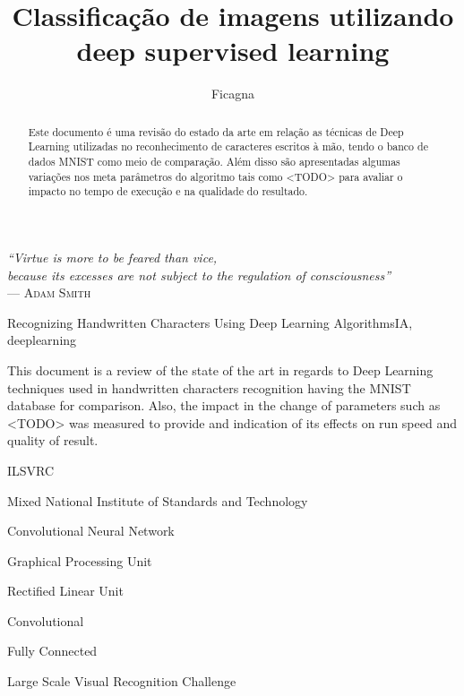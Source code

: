 \documentclass[cic,tc]{iiufrgs}
\title{Classificação de imagens utilizando deep supervised learning}
\author{Ficagna}{Alan}
\date{}{2015}
\begin{document}
\maketitle

\clearpage
\begin{flushright}
  \mbox{}\vfill
  {\sffamily\itshape{}
    ``Virtue is more to be feared than vice,\\
    because its excesses are not subject to the regulation of consciousness''\\}
  --- \textsc{Adam Smith}
\end{flushright}

\begin{abstract}

Este documento é uma revisão do estado da arte em relação as técnicas de
Deep Learning utilizadas no reconhecimento de caracteres escritos à mão, tendo o
banco de dados MNIST como meio de comparação. Além disso são apresentadas
algumas variações nos meta parâmetros do algoritmo tais como <TODO> para
avaliar o impacto no tempo de execução e na qualidade do resultado.
\end{abstract}

\begin{englishabstract}{Recognizing Handwritten Characters Using Deep Learning Algorithms}{IA, deeplearning} %

This document is a review of the state of the art in regards to Deep Learning
techniques used in handwritten characters recognition having the MNIST
database for comparison. Also, the impact in the change of parameters such as
<TODO> was measured to provide and indication of its effects on run speed and
quality of result.
\end{englishabstract}

\listoffigures
\listoftables
\begin{listofabbrv}{ILSVRC} %
 \item[MNIST] Mixed National Institute of Standards and Technology
 \item[CNN] Convolutional Neural Network
 \item[GPU] Graphical Processing Unit
 \item[ReLU] Rectified Linear Unit
 \item[CONV] Convolutional
 \item[FC] Fully Connected
 \item[ILSVRC] Large Scale Visual Recognition Challenge
\end{listofabbrv}
\tableofcontents
\end{document}
